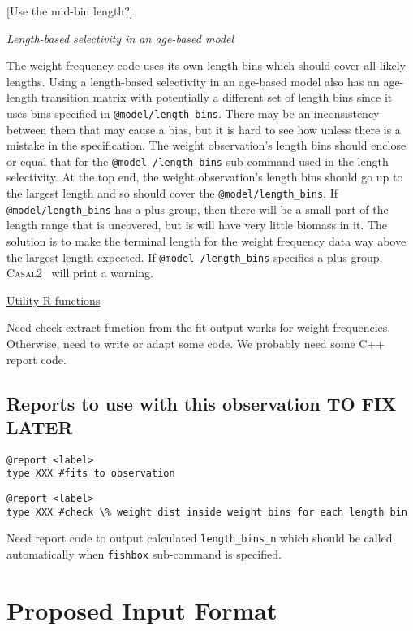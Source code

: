 \documentclass[a4paper,11pt,twoside,pdftex,draft]{article}
\newcommand{\CNAME}{\textsc{Casal2}}
\begin{document}
[Use the mid-bin length?]

\emph{Length-based selectivity in an age-based model}

The weight frequency code uses its own length bins which should cover all likely lengths. Using a length-based selectivity in an age-based model also has an age-length transition matrix with potentially a different set of length bins since it uses bins specified in \texttt{@model/length\_bins}. There may be an inconsistency between them that may cause a bias, but it is hard to see how unless there is a mistake in the specification. The weight observation's length bins should enclose or equal that for the \texttt{@model /length\_bins}  sub-command used in the length selectivity. At the top end, the weight observation's length bins should go up to the largest length and so should cover the \texttt{@model/length\_bins}. If \texttt{@model/length\_bins}   has a plus-group, then there will be a small part of the length range that is uncovered, but is will have very little biomass in it. The solution is to make the terminal length for the weight frequency data way above the largest length expected. If 
\texttt{@model /length\_bins} specifies a plus-group, \CNAME~ will print a warning.


\bigskip
\underline{Utility R functions}

Need check extract function from the fit output works for weight frequencies. Otherwise, need to write or adapt some code. 
We probably need some C++ report code. 

\subsection{Reports to use with this observation TO FIX LATER}

{\small{\begin{verbatim}
@report <label>
type XXX #fits to observation

\end{verbatim}}}


{\small{\begin {verbatim}
@report <label>
type XXX #check \% weight dist inside weight bins for each length bin

\end{verbatim}}}

Need report code to output calculated \texttt{length\_bins\_n} which should be called automatically when \texttt{fishbox} sub-command is specified.


\section{Proposed Input Format}
\end{document}
